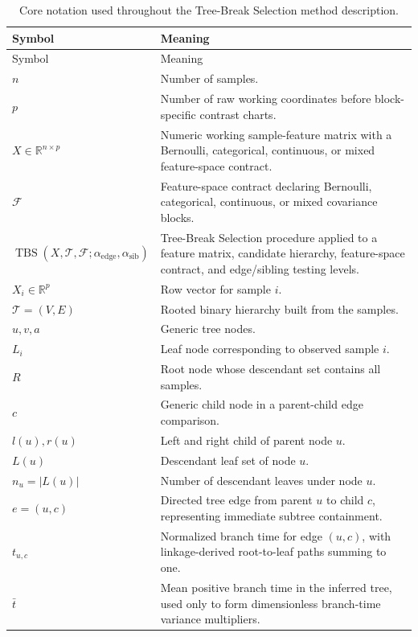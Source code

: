{\small
\begin{longtable}{@{}p{}p{}@{}}
\caption{Core notation used throughout the Tree-Break Selection method description.}
\label{tab:notation}\\
\toprule
Symbol & Meaning \\
\midrule
\endfirsthead
\toprule
Symbol & Meaning \\
\midrule
\endhead
\bottomrule
\endfoot
$n$ & Number of samples. \\
$p$ & Number of raw working coordinates before block-specific contrast charts. \\
$X \in \mathbb{R}^{n \times p}$ & Numeric working sample-feature matrix with a Bernoulli, categorical, continuous, or mixed feature-space contract. \\
$\mathcal F$ & Feature-space contract declaring Bernoulli, categorical, continuous, or mixed covariance blocks. \\
\(\operatorname{TBS}(X,\mathcal T,\mathcal F;\alpha_{\mathrm{edge}},\alpha_{\mathrm{sib}})\) & Tree-Break Selection procedure applied to a feature matrix, candidate hierarchy, feature-space contract, and edge/sibling testing levels. \\
$X_i \in \mathbb{R}^p$ & Row vector for sample $i$. \\
$\mathcal{T} = (V,E)$ & Rooted binary hierarchy built from the samples. \\
$u, v, a$ & Generic tree nodes. \\
$L_i$ & Leaf node corresponding to observed sample $i$. \\
$R$ & Root node whose descendant set contains all samples. \\
$c$ & Generic child node in a parent-child edge comparison. \\
$l(u), r(u)$ & Left and right child of parent node $u$. \\
$L(u)$ & Descendant leaf set of node $u$. \\
$n_u = |L(u)|$ & Number of descendant leaves under node $u$. \\
$e = (u,c)$ & Directed tree edge from parent $u$ to child $c$, representing immediate subtree containment. \\
$t_{u,c}$ & Normalized branch time for edge $(u,c)$, with linkage-derived root-to-leaf paths summing to one. \\
$\bar t$ & Mean positive branch time in the inferred tree, used only to form dimensionless branch-time variance multipliers. \\

\end{longtable}}
